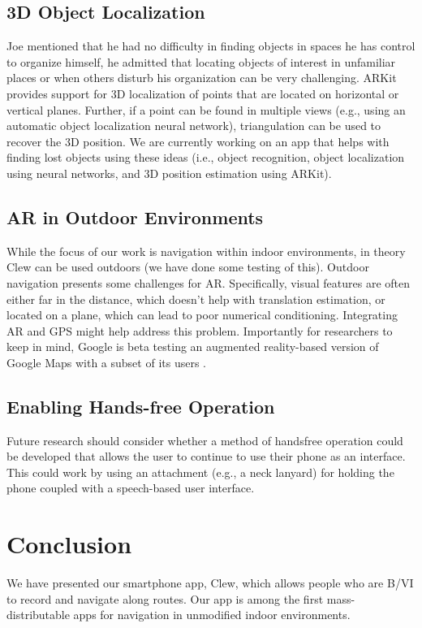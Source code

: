 \documentclass[chi_draft]{sigchi}
\newcommand{\BVI}{B/VI\xspace}
\begin{document}
\subsection{3D Object Localization}

Joe mentioned that he had no difficulty in finding objects in spaces he has control to organize himself, he admitted that locating objects of interest in unfamiliar places or when others disturb his organization can be very challenging.  ARKit provides support for 3D localization of points that are located on horizontal or vertical planes.  Further, if a point can be found in multiple views (e.g., using an automatic object localization neural network), triangulation can be used to recover the 3D position.  We are currently working on an app that helps with finding lost objects using these ideas (i.e., object recognition, object localization using neural networks, and 3D position estimation using ARKit).

\subsection{AR in Outdoor Environments}
While the focus of our work is navigation within indoor environments, in theory Clew can be used outdoors (we have done some testing of this).  Outdoor navigation presents some challenges for AR.  Specifically, visual features are often either far in the distance, which doesn't help with translation estimation, or located on a plane, which can lead to poor numerical conditioning.  Integrating AR and GPS might help address this problem.  Importantly for researchers to keep in mind, Google is beta testing an augmented reality-based version of Google Maps with a subset of its users \cite{gmapAR}.

\subsection{Enabling Hands-free Operation} 
Future research should consider whether a method of handsfree operation could be developed that allows the user to continue to use their phone as an interface.  This could work by using an attachment (e.g., a neck lanyard) for holding the phone coupled with a speech-based user interface. %

\section{Conclusion}
We have presented our smartphone app, Clew, which allows people who are \BVI to record and navigate along routes.  Our app is among the first mass-distributable apps for navigation in unmodified indoor environments.%
\end{document}
